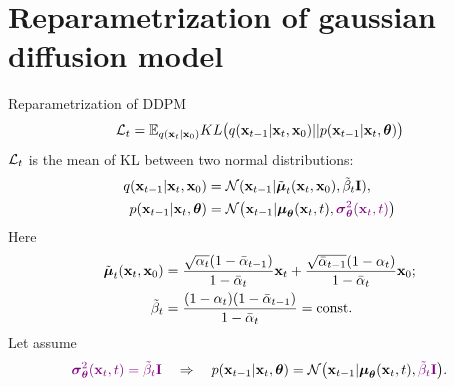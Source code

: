 \section{Reparametrization of gaussian diffusion model}
\begin{frame}{Reparametrization of DDPM}
	\[
		\mathcal{L}_t = \mathbb{E}_{q(\mathbf{x}_t | \mathbf{x}_0)} KL \bigl(q(\mathbf{x}_{t-1} | \mathbf{x}_t, \mathbf{x}_0) || p(\mathbf{x}_{t - 1} | \mathbf{x}_t, \boldsymbol{\theta} )\bigr)
	\]
	$\mathcal{L}_t$ is the mean of KL between two normal distributions:
	\begin{align*}
		q(\mathbf{x}_{t-1} | \mathbf{x}_t, \mathbf{x}_0) &= \mathcal{N}(\mathbf{x}_{t-1} | \tilde{\boldsymbol{\mu}}_t(\mathbf{x}_t, \mathbf{x}_0), \tilde{\beta}_t \mathbf{I}), \\
		p(\mathbf{x}_{t - 1} | \mathbf{x}_t, \boldsymbol{\theta}) &= \mathcal{N} \bigl(\mathbf{x}_{t - 1} | \boldsymbol{\mu}_{\boldsymbol{\theta}}(\mathbf{x}_t, t), {\color{violet}\boldsymbol{\sigma}_{\boldsymbol{\theta}}^2(\mathbf{x}_t, t)}\bigr)
	\end{align*}
	Here
	\begin{align*}
		\tilde{\boldsymbol{\mu}}_t(\mathbf{x}_t, \mathbf{x}_0) &= \frac{\sqrt{\alpha_t}(1 - \bar{\alpha}_{t-1})}{1 - \bar{\alpha}_t} \mathbf{x}_t + \frac{\sqrt{\bar{\alpha}_{t-1}}(1 - \alpha_t)}{1 - \bar{\alpha}_t} \mathbf{x}_0; \\
		\tilde{\beta}_t &= \frac{(1 - \alpha_t)(1 - \bar{\alpha}_{t-1})}{1 - \bar{\alpha}_t} = \text{const}.
	\end{align*}
	Let assume
	\[
		{\color{violet}\boldsymbol{\sigma}_{\boldsymbol{\theta}}^2(\mathbf{x}_t, t) = \tilde{\beta}_t \mathbf{I}} \quad \Rightarrow \quad p(\mathbf{x}_{t - 1} | \mathbf{x}_t, \boldsymbol{\theta}) = \mathcal{N} \bigl(\mathbf{x}_{t - 1} | \boldsymbol{\mu}_{\boldsymbol{\theta}}(\mathbf{x}_t, t), {\color{violet}\tilde{\beta}_t \mathbf{I}} \bigr).
	\]
\end{frame}
